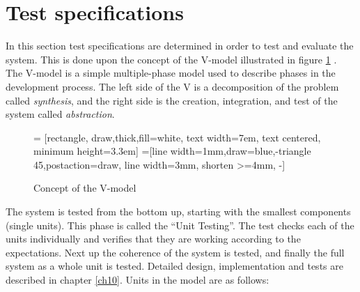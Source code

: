 \section{Test specifications}\label{sec:testspec}
In this section test specifications are determined in order to test and evaluate the system. This is done upon the concept of the V-model illustrated in figure \ref{fig:vmodel} \cite{vmodel}. The V-model is a simple multiple-phase model used to describe phases in the development process. The left side of the V is a decomposition of the problem called \textit{synthesis}, and the right side is the creation, integration, and test of the system called \textit{abstraction}.
\begin{figure}[H]
\centering
{} = [rectangle, draw,thick,fill=white, 
    text width=7em, text centered, minimum height=3.3em]
=[line width=1mm,draw=blue,-triangle 45,postaction={draw, line width=3mm, shorten >=4mm, -}]
\caption{Concept of the V-model}
\label{fig:vmodel}
\end{figure}
%
The system is tested from the bottom up, starting with the smallest components (single units). This phase is called the ``Unit Testing''. The test checks each of the units individually and verifies that they are working according to the expectations. Next up the coherence of the system is tested, and finally the full system as a whole unit is tested. Detailed design, implementation and tests are described in chapter \ref{ch10}. Units in the model are as follows:
